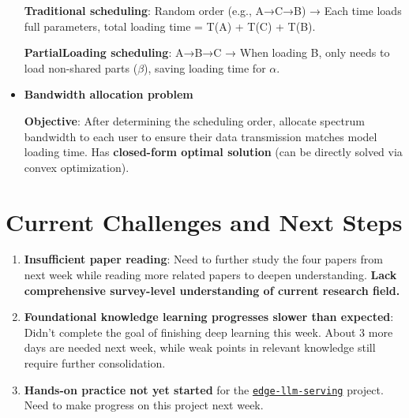 \documentclass[conference]{IEEEtran}
\begin{document}
\begin{CJK}{UTF8}{gbsn}
\begin{itemize}
\textbf{Traditional scheduling}: Random order (e.g., A→C→B) → Each time loads full parameters, total loading time = T(A) + T(C) + T(B).

\textbf{PartialLoading scheduling}: A→B→C → When loading B, only needs to load non-shared parts ($\beta$), saving loading time for $\alpha$.

\item \textbf{Bandwidth allocation problem}

\textbf{Objective}: After determining the scheduling order, allocate spectrum bandwidth to each user to ensure their data transmission matches model loading time. Has \textbf{closed-form optimal solution} (can be directly solved via convex optimization).
\end{itemize}

\section{Current Challenges and Next Steps}
\begin{enumerate}[leftmargin=*]
\item \textbf{Insufficient paper reading}: Need to further study the four papers from next week while reading more related papers to deepen understanding. \textbf{Lack comprehensive survey-level understanding of current research field.}

\item \textbf{Foundational knowledge learning progresses slower than expected}: Didn't complete the goal of finishing deep learning this week. About 3 more days are needed next week, while weak points in relevant knowledge still require further consolidation.

\item \textbf{Hands-on practice not yet started} for the \href{https://github.com/ZinuoCai/edge-llm-serving}{\texttt{edge-llm-serving}} project. Need to make progress on this project next week.
\end{enumerate}

\end{CJK}
\end{document}
